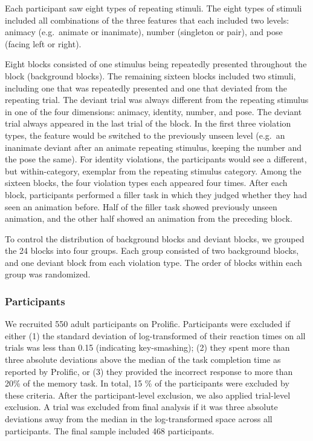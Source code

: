 \documentclass[10pt, letterpaper]{article}
\begin{document}
Each participant saw eight types of repeating stimuli. The eight types
of stimuli included all combinations of the three features that each
included two levels: animacy (e.g.~animate or inanimate), number
(singleton or pair), and pose (facing left or right).

Eight blocks consisted of one stimulus being repeatedly presented
throughout the block (background blocks). The remaining sixteen blocks
included two stimuli, including one that was repeatedly presented and
one that deviated from the repeating trial. The deviant trial was always
different from the repeating stimulus in one of the four dimensions:
animacy, identity, number, and pose. The deviant trial always appeared
in the last trial of the block. In the first three violation types, the
feature would be switched to the previously unseen level (e.g.~an
inanimate deviant after an animate repeating stimulus, keeping the
number and the pose the same). For identity violations, the participants
would see a different, but within-category, exemplar from the repeating
stimulus category. Among the sixteen blocks, the four violation types
each appeared four times. After each block, participants performed a
filler task in which they judged whether they had seen an animation
before. Half of the filler task showed previously unseen animation, and
the other half showed an animation from the preceding block.

To control the distribution of background blocks and deviant blocks, we
grouped the 24 blocks into four groups. Each group consisted of two
background blocks, and one deviant block from each violation type. The
order of blocks within each group was randomized.

\hypertarget{participants}{%
\subsubsection{Participants}\label{participants}}

We recruited 550 adult participants on Prolific. Participants were
excluded if either (1) the standard deviation of log-transformed of
their reaction times on all trials was less than 0.15 (indicating
key-smashing); (2) they spent more than three absolute deviations above
the median of the task completion time as reported by Prolific, or (3)
they provided the incorrect response to more than 20\% of the memory
task. In total, 15 \% of the participants were excluded by these
criteria. After the participant-level exclusion, we also applied
trial-level exclusion. A trial was excluded from final analysis if it
was three absolute deviations away from the median in the
log-transformed space across all participants. The final sample included
468 participants.
\end{document}
